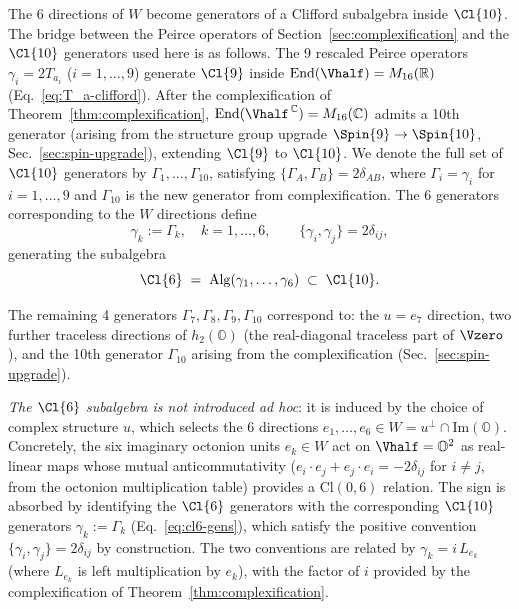 The 6 directions of $W$ become generators of a Clifford subalgebra
inside $\Cl{10}$.  The bridge between the Peirce operators of
Section~\ref{sec:complexification} and the $\Cl{10}$ generators used
here is as follows.  The 9 rescaled Peirce operators
$\gamma_i = 2T_{a_i}$ ($i = 1,\ldots,9$) generate $\Cl{9}$ inside
$\mathrm{End}(\Vhalf) = M_{16}(\mathbb{R})$
(Eq.~\eqref{eq:T_a-clifford}).  After the complexification of
Theorem~\ref{thm:complexification}, $\mathrm{End}(\Vhalf^{\,\mathbb{C}})
= M_{16}(\mathbb{C})$ admits a 10th generator (arising from the
structure group upgrade $\Spin{9}\to\Spin{10}$,
Sec.~\ref{sec:spin-upgrade}), extending $\Cl{9}$ to $\Cl{10}$.  We
denote the full set of $\Cl{10}$ generators by
$\Gamma_1,\ldots,\Gamma_{10}$, satisfying
$\{\Gamma_A,\Gamma_B\} = 2\delta_{AB}$, where $\Gamma_i = \gamma_i$
for $i = 1,\ldots,9$ and $\Gamma_{10}$ is the new generator from
complexification.
The 6 generators corresponding to the $W$ directions define
\begin{equation}\label{eq:cl6-gens}
  \gamma_k := \Gamma_k, \quad k=1,\ldots,6,
  \qquad
  \{\gamma_i,\gamma_j\} = 2\delta_{ij},
\end{equation}
generating the subalgebra
\begin{equation}\label{eq:cl6-def}
  \Cl{6}
  \;=\; \mathrm{Alg}(\gamma_1,\ldots,\gamma_6)
  \;\subset\; \Cl{10}.
\end{equation}

The remaining 4 generators $\Gamma_7,\Gamma_8,\Gamma_9,\Gamma_{10}$
correspond to: the $u = e_7$ direction, two further traceless
directions of $h_2(\mathbb{O})$ (the real-diagonal traceless part of
$\Vzero$), and the 10th generator $\Gamma_{10}$ arising from the
complexification (Sec.~\ref{sec:spin-upgrade}).

\emph{The $\Cl{6}$ subalgebra is not introduced ad hoc}: it is
induced by the choice of complex structure $u$, which selects the
6 directions $e_1,\ldots,e_6\in W = u^\perp\cap\mathrm{Im}(\mathbb{O})$.
Concretely, the six imaginary octonion units $e_k\in W$ act on
$\Vhalf = \mathbb{O}^2$ as real-linear maps whose mutual
anticommutativity ($e_i\cdot e_j + e_j\cdot e_i = -2\delta_{ij}$
for $i\neq j$, from the octonion multiplication table) provides
a $\mathrm{Cl}(0,6)$ relation.  The sign is absorbed by
identifying the $\Cl{6}$ generators with the corresponding
$\Cl{10}$ generators $\gamma_k := \Gamma_k$
(Eq.~\eqref{eq:cl6-gens}), which satisfy the positive convention
$\{\gamma_i,\gamma_j\} = 2\delta_{ij}$ by construction.  The
two conventions are related by $\gamma_k = i\,L_{e_k}$ (where
$L_{e_k}$ is left multiplication by $e_k$), with the factor of
$i$ provided by the complexification of
Theorem~\ref{thm:complexification}.

